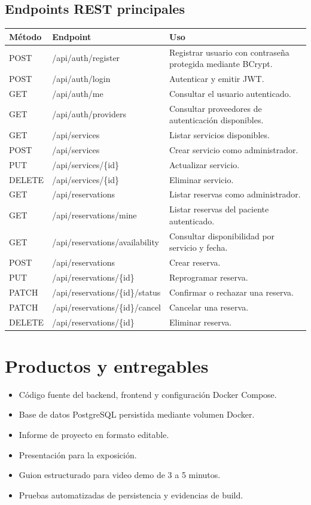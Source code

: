 \documentclass[12pt,a4paper,oneside]{report}
\begin{document}
\subsection{Endpoints REST principales}
\begin{tabularx}{\textwidth}{|p{2cm}|p{5.2cm}|Y|}
\hline
{}\color{white}\textbf{Método} & \color{white}\textbf{Endpoint} & \color{white}\textbf{Uso}\\
\hline
POST & /api/auth/register & Registrar usuario con contraseña protegida mediante BCrypt.\\ \hline
POST & /api/auth/login & Autenticar y emitir JWT.\\ \hline
GET & /api/auth/me & Consultar el usuario autenticado.\\ \hline
GET & /api/auth/providers & Consultar proveedores de autenticación disponibles.\\ \hline
GET & /api/services & Listar servicios disponibles.\\ \hline
POST & /api/services & Crear servicio como administrador.\\ \hline
PUT & /api/services/\{id\} & Actualizar servicio.\\ \hline
DELETE & /api/services/\{id\} & Eliminar servicio.\\ \hline
GET & /api/reservations & Listar reservas como administrador.\\ \hline
GET & /api/reservations/mine & Listar reservas del paciente autenticado.\\ \hline
GET & /api/reservations/availability & Consultar disponibilidad por servicio y fecha.\\ \hline
POST & /api/reservations & Crear reserva.\\ \hline
PUT & /api/reservations/\{id\} & Reprogramar reserva.\\ \hline
PATCH & /api/reservations/\{id\}/status & Confirmar o rechazar una reserva.\\ \hline
PATCH & /api/reservations/\{id\}/cancel & Cancelar una reserva.\\ \hline
DELETE & /api/reservations/\{id\} & Eliminar reserva.\\ \hline
\end{tabularx}

\section{Productos y entregables}
\begin{itemize}
\item Código fuente del backend, frontend y configuración Docker Compose.
\item Base de datos PostgreSQL persistida mediante volumen Docker.
\item Informe de proyecto en formato editable.
\item Presentación para la exposición.
\item Guion estructurado para video demo de 3 a 5 minutos.
\item Pruebas automatizadas de persistencia y evidencias de build.
\end{itemize}
\end{document}
